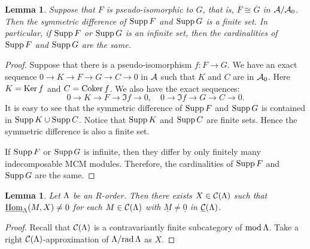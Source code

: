 \documentclass[11pt]{amsart}
\newtheorem{lemma}[theorem]{Lemma}
\theoremstyle{definition}
\numberwithin{equation}{section}
\begin{document}
\begin{lemma}\label{C9}
Suppose that $F$ is pseudo-isomorphic to $G$, that is, $\overline{F} \cong \overline{G}$ in $\AA / \AA_0$. 
Then the symmetric difference of $\Supp F$ and $\Supp G$ is a finite set. 
In particular, if $\Supp F$ or $\Supp G$ is an infinite set, then the cardinalities of $\Supp F$ and $\Supp G$ are the same.   
\end{lemma}

\begin{proof}
Suppose that there is a pseudo-isomorphism $f : F \to G$. 
We have an exact sequence $0 \to K \to F \to G \to C \to 0$ in $\AA$ such that $K$ and $C$ are in $\AA_0$. 
Here $K = \Ker f$ and $C=\Coker f$. 
We also have the exact sequences: 
$$
0 \to K \to F \to \Im f \to 0, \quad 0 \to \Im f \to G \to C \to 0. 
$$
It is easy to see that the symmetric difference of $\Supp F$ and $\Supp G$ is contained in $\Supp K \cup \Supp C$. 
Notice that $\Supp K$ and $\Supp C$ are finite sets. 
Hence the symmetric difference is also a finite set. 

If $\Supp F$ or $\Supp G$ is infinite, then they differ by only finitely many indecomposable MCM modules. 
Therefore, the cardinalities of $\Supp F$ and $\Supp G$ are the same.
\end{proof}


\begin{lemma}\cite[Lemma 2.1]{H17}\cite[Proposition 4.7]{E19}\label{C12}
Let $\LL$ be an $R$-order. 
Then there exists $X \in \CML$ such that $\sHomL (M, X) \not= 0$ for each $M \in \CML$ with $\underline{M} \not= \underline{0}$ in $\sCML$. 
\end{lemma}

\begin{proof}
Recall that $\CML$ is a contravariantly finite subcategory of $\mod \LL$. 
Take a right $\CML$-approximation of $\LL / \rad \LL$ as $X$.  
\end{proof}
\end{document}
